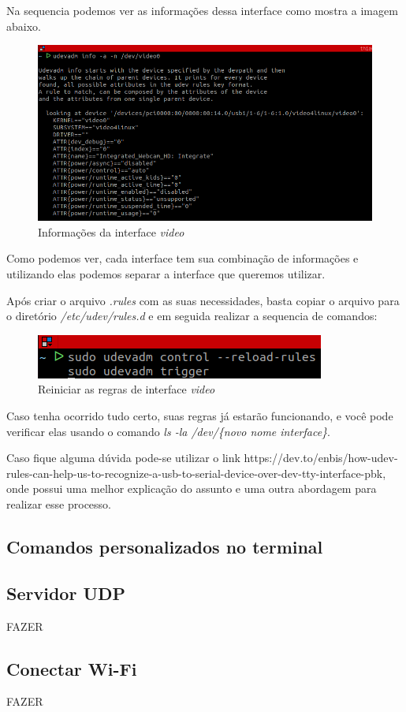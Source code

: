 		Na sequencia podemos ver as informações dessa interface como mostra a imagem abaixo.
		
		\begin{figure}[H]
			\centering
			\caption{Informações da interface \textit{video}}
			\includegraphics[scale=0.5]{sections/programacao/procedimentos/imagens/interface_info.png}
		\end{figure}
	
		Como podemos ver, cada interface tem sua combinação de informações e utilizando elas podemos separar a interface que queremos utilizar.
		
		Após criar o arquivo \textit{.rules} com as suas necessidades, basta copiar o arquivo para o diretório \textit{/etc/udev/rules.d}
		e em seguida realizar a sequencia de comandos:
		
		\begin{figure}[H]
			\centering
			\caption{Reiniciar as regras de interface \textit{video}}
			\includegraphics[scale=0.5]{sections/programacao/procedimentos/imagens/reload_rules.png}
		\end{figure}
		
		Caso tenha ocorrido tudo certo, suas regras já estarão funcionando, e você pode verificar elas usando o comando \textit{ls -la /dev/\{novo nome interface\}}. 
		
		Caso fique alguma dúvida pode-se utilizar o link https://dev.to/enbis/how-udev-rules-can-help-us-to-recognize-a-usb-to-serial-device-over-dev-tty-interface-pbk, onde possui uma melhor explicação do assunto e uma outra abordagem para realizar esse processo.		

\subsection{Comandos personalizados no terminal}		

\subsection{Servidor UDP}
FAZER

\subsection{Conectar Wi-Fi}
FAZER
